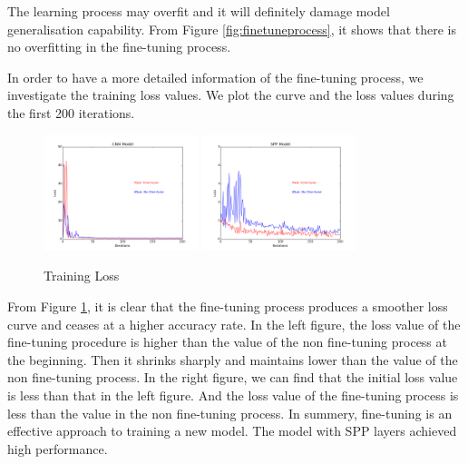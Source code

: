 The learning process may overfit and it will definitely damage model generalisation capability. From Figure \ref{fig:finetuneprocess}, it shows that there is no overfitting in the fine-tuning process.

In order to have a more detailed information of the fine-tuning process, we investigate the training loss values. We plot the curve and the loss values during the first 200 iterations.

\begin{figure}[!htb]
    \centering
	\includegraphics[width=0.4\textwidth]{finetuneCNNProcess.png}
	\includegraphics[width=0.4\textwidth]{finetuneSPPProcess.png}
    \caption{Training Loss}%
    \label{fig:FTvsSC}%
\end{figure}

From Figure \ref{fig:FTvsSC}, it is clear that the fine-tuning process produces a smoother loss curve and ceases at a higher accuracy rate. In the left figure, the loss value of the fine-tuning procedure is higher than the value of the non fine-tuning process at the beginning. Then it shrinks sharply and maintains lower than the value of the non fine-tuning process. In the right figure, we can find that the initial loss value is less than that in the left figure. And the loss value of the fine-tuning process is less than the value in the non fine-tuning process. In summery, fine-tuning is an effective approach to training a new model. The model with SPP layers achieved high performance.

